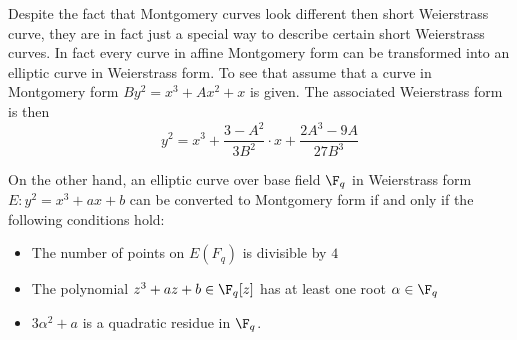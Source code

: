 Despite the fact that Montgomery curves look different then short Weierstrass curve, they are in fact just a special way to describe certain short Weierstrass curves. In fact every curve in affine Montgomery form can be transformed into an elliptic curve in Weierstrass form. To see that assume that a curve in Montgomery form $B y^2 = x^3 + A x^2 + x$ is given. The associated Weierstrass form is then
$$
y^2 = x^3 + \frac{3-A^2}{3B^2}\cdot x + \frac{2A^3-9A}{27B^3}
$$
 
On the other hand, an elliptic curve over base field $\F_q$ in Weierstrass form $E: y^2 = x^3 + a x + b$ can be converted to Montgomery form if and only if the following conditions hold:
\begin{itemize}
\item The number of points on $E(F_q)$ is divisible by $4$
\item The polynomial $z^3 + a z + b \in \F_q[z]$ has at least one root $\alpha\in\F_q$
\item $3\alpha^2 + a$ is a quadratic residue in $\F_q$.
\end{itemize}

